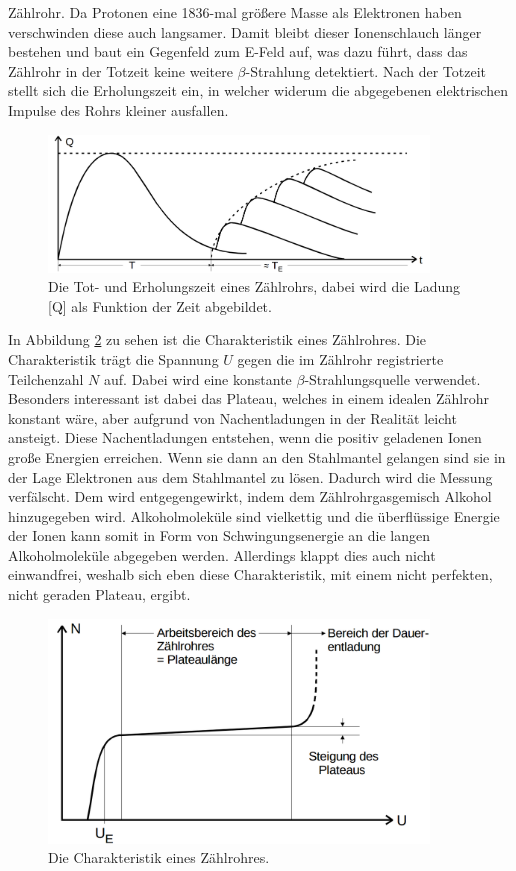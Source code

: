 \documentclass[
  bibliography=totoc,     %
  captions=tableheading,  %
  titlepage=firstiscover, %
]{scrartcl}
\begin{document}
Zählrohr. Da Protonen eine 1836-mal größere Masse als Elektronen haben
verschwinden diese auch langsamer. Damit bleibt dieser Ionenschlauch länger
bestehen und baut ein Gegenfeld zum E-Feld auf, was dazu führt, dass das
Zählrohr in der Totzeit keine weitere $\beta$-Strahlung detektiert.
Nach der Totzeit stellt sich die Erholungszeit ein, in welcher widerum die
abgegebenen elektrischen Impulse des Rohrs kleiner ausfallen.
\begin{figure}[htb]
  \centering
  \includegraphics[width=0.9\textwidth]{V7033.png}
  \caption{Die Tot- und Erholungszeit eines Zählrohrs, dabei wird die Ladung [Q]
  als Funktion der Zeit abgebildet.}
  \label{fig:V7033}
\end{figure}
In Abbildung \ref{fig:V7034} zu sehen ist die Charakteristik eines Zählrohres.
Die Charakteristik trägt die Spannung $U$ gegen die im Zählrohr registrierte
Teilchenzahl $N$ auf. Dabei wird eine konstante $\beta$-Strahlungsquelle verwendet.
Besonders interessant ist dabei das Plateau, welches in einem idealen Zählrohr
konstant wäre, aber aufgrund von Nachentladungen in der Realität leicht ansteigt.
Diese Nachentladungen entstehen, wenn die positiv geladenen Ionen große Energien
erreichen. Wenn sie dann an den Stahlmantel gelangen sind sie in der Lage
Elektronen aus dem Stahlmantel zu lösen. Dadurch wird die Messung verfälscht.
Dem wird entgegengewirkt, indem dem Zählrohrgasgemisch Alkohol hinzugegeben wird.
Alkoholmoleküle sind vielkettig und die überflüssige Energie der Ionen kann
somit in Form von Schwingungsenergie an die langen Alkoholmoleküle abgegeben werden.
Allerdings klappt dies auch nicht einwandfrei, weshalb sich eben diese
Charakteristik, mit einem nicht perfekten, nicht geraden Plateau, ergibt.
\begin{figure}[htb]
  \centering
  \includegraphics[width=0.9\textwidth]{V7034.png}
  \caption{Die Charakteristik eines Zählrohres.}
  \label{fig:V7034}
\end{figure}
\end{document}
